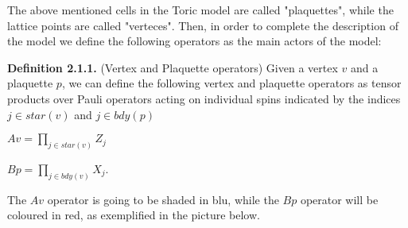 \documentclass[12pt]{report}
\begin{document}
	
	\begin{minipage}{1\textwidth}
		
		The above mentioned cells in the Toric model are called "plaquettes", while the lattice points are called "verteces".
		Then, in order to complete the description of the model we define the following operators as the main actors of the model:\newline
		
		\textbf{Definition 2.1.1.} (Vertex and Plaquette operators) Given a vertex $v$ and a plaquette $p$, we can define the following vertex and plaquette operators as tensor products over Pauli operators acting on individual spins indicated by the indices $j \in star(v)$ and $j \in bdy(p)$  \newline 
		
		\begin{center}
			$ Av = \prod_{j \in star(v)} Z_j $ \newline
			
			$ Bp = \prod_{j \in bdy(v)} X_j $.\newline
		\end{center}
		
		The $Av$ operator is going to be shaded in blu, while the $Bp$ operator will be coloured in red, as exemplified in the picture below. \newline
		
		\begin{center}
\end{center}
\end{minipage}
\end{document}
